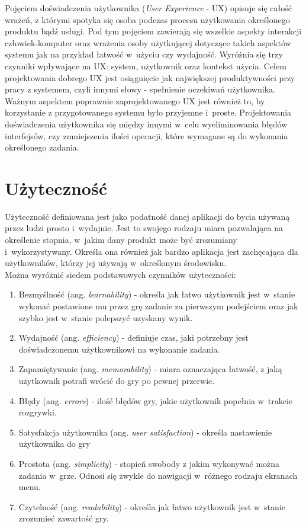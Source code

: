 \documentclass[a4paper,12pt,numbers=noenddot]{report}
\begin{document}
Pojęciem doświadczenia użytkownika (\textit{User Experience} - UX) opisuje się całość wrażeń, z którymi spotyka się osoba podczas procesu użytkowania określonego produktu bądź usługi. Pod tym pojęciem zawierają się wszelkie aspekty interakcji człowiek-komputer oraz wrażenia osoby użytkującej dotyczące takich aspektów systemu jak na przykład łatwość w~użyciu czy wydajność. Wyróżnia się trzy czynniki wpływające na UX: system, użytkownik oraz kontekst użycia. \cite{online_UXDef}
Celem projektowania dobrego UX jest osiągnięcie jak największej produktywności przy pracy z systemem, czyli innymi słowy - spełnienie oczekiwań użytkownika. Ważnym aspektem poprawnie zaprojektowanego UX jest również to, by korzystanie z przygotowanego systemu było przyjemne i~proste. Projektowania doświadczenia użytkownika się między innymi w~celu wyeliminowania błędów interfejsów, czy zmniejszenia ilości operacji, które wymagane są do wykonania określonego zadania.
\cite{art_UserExperience}

\section{Użyteczność}
Użyteczność definiowana jest jako podatność danej aplikacji do bycia używaną przez ludzi prosto i~wydajnie\cite{art_Usability}. Jest to swojego rodzaju miara pozwalająca na określenie stopnia, w~jakim dany produkt może być zrozumiany i~wykorzystywany. Określa ona również jak bardzo aplikacja jest zachęcająca dla użytkowników, którzy jej używają w~określonym środowisku. \cite{art_evaluationOfMGevaluationSystem} 
\\
Można wyróżnić siedem podstawowych czynników użyteczności: \cite{art_UsabilityEvaluationSystematicReview}
\begin{enumerate}
\item Bezmyślność (ang. \textit{learnability}) - określa jak łatwo użytkownik jest w~stanie wykonać postawione mu przez grę zadanie za pierwszym podejściem oraz jak szybko jest w~stanie polepszyć uzyskany wynik.
\item Wydajność (ang. \textit{efficiency}) - definiuje czas, jaki potrzebny jest doświadczonemu użytkownikowi na wykonanie zadania.
\item Zapamiętywanie (ang. \textit{memorability}) - miara oznaczająca łatwość, z jaką użytkownik potrafi wrócić do gry po pewnej przerwie.
\item Błędy (ang. \textit{errors}) - ilość błędów gry, jakie użytkownik popełnia w~trakcie rozgrywki.
\item Satysfakcja użytkownika (ang. \textit{user satisfaction}) - określa nastawienie użytkownika do gry
\item Prostota (ang. \textit{simplicity}) - stopień swobody z jakim wykonywać można zadania w~grze. Odnosi się zwykle do nawigacji w~różnego rodzaju ekranach menu.
\item Czytelność (ang. \textit{readability}) - określa jak łatwo użytkownik jest w~stanie zrozumieć zawartość gry.
\end{enumerate}
\end{document}
